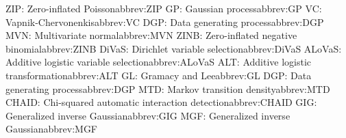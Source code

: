 \begin{tabbing}
\addabbrev ZIP: {\hspace{.4in}Zero-inflated Poisson}{abbrev:ZIP}
\addabbrev GP: {\hspace{.4in}Gaussian process}{abbrev:GP}
\addabbrev VC: {\hspace{.4in}Vapnik-Chervonenkis}{abbrev:VC}
\addabbrev DGP: {\hspace{.4in}Data generating process}{abbrev:DGP}
\addabbrev MVN: {\hspace{.4in}Multivariate normal}{abbrev:MVN}
\addabbrev ZINB: {\hspace{.4in}Zero-inflated negative binomial}{abbrev:ZINB}
\addabbrev DiVaS: {\hspace{.4in}Dirichlet variable selection}{abbrev:DiVaS}
\addabbrev ALoVaS: {\hspace{.4in}Additive logistic variable selection}{abbrev:ALoVaS}
\addabbrev ALT: {\hspace{.4in}Additive logistic transformation}{abbrev:ALT}
\addabbrev GL: {\hspace{.4in}Gramacy and Lee}{abbrev:GL}
\addabbrev DGP: {\hspace{.4in}Data generating process}{abbrev:DGP}
\addabbrev MTD: {\hspace{.4in}Markov transition density}{abbrev:MTD}
\addabbrev CHAID: {\hspace{.4in}Chi-squared automatic interaction detection}{abbrev:CHAID}
\addabbrev GIG: {\hspace{.4in}Generalized inverse Gaussian}{abbrev:GIG}
\addabbrev MGF: {\hspace{.4in}Generalized inverse Gaussian}{abbrev:MGF}



\end{tabbing}